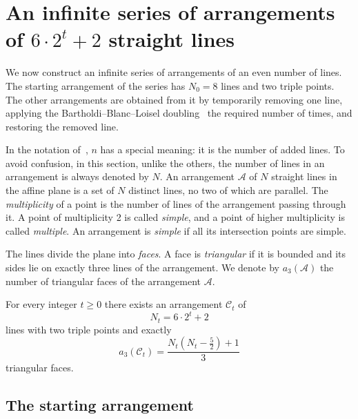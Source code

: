 \section{An infinite series of arrangements of \texorpdfstring{$6\cdot2^t+2$}{6·2ᵗ + 2} straight lines}\label{sec:series}

We now construct an infinite series of arrangements of an even number of lines.
The starting arrangement of the series has $N_0=8$ lines and two triple points.
The other arrangements are obtained from it by temporarily removing one line, applying the Bartholdi--Blanc--Loisel doubling~\cite{bbl} the required number of times, and restoring the removed line.

In the notation of~\cite{bbl}, $n$ has a special meaning: it is the number of added lines.
To avoid confusion, in this section, unlike the others, the number of lines in an arrangement is always denoted by $N$.
An arrangement $\mathcal A$ of $N$ straight lines in the affine plane is a set of $N$ distinct lines, no two of which are parallel.
The \emph{multiplicity} of a point is the number of lines of the arrangement passing through it.
A point of multiplicity 2 is called \emph{simple}, and a point of higher multiplicity is called \emph{multiple}.
An arrangement is \emph{simple} if all its intersection points are simple.

The lines divide the plane into \emph{faces}.
A face is \emph{triangular} if it is bounded and its sides lie on exactly three lines of the arrangement.
We denote by $a_3(\mathcal A)$ the number of triangular faces of the arrangement $\mathcal A$.

\begin{theorem}\label{thm:series}
For every integer $t\ge0$ there exists an arrangement $\mathcal{C}_t$ of
\begin{equation}\label{eq:N-t}
N_t=6\cdot2^t+2
\end{equation}
lines with two triple points and exactly
\begin{equation}\label{eq:a3-series}
a_3(\mathcal{C}_t)=\frac{N_t(N_t-\frac52)+1}{3}
\end{equation}
triangular faces.
\end{theorem}

\subsection{The starting arrangement}

